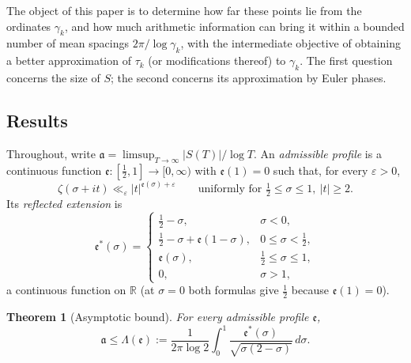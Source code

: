 \documentclass[11pt,a4paper]{article}
\numberwithin{equation}{section}
\newtheorem{theorem}{Theorem}[section]
\theoremstyle{definition}
\theoremstyle{remark}
\newcommand{\R}{\mathbb R}
\begin{document}
The object of this paper is to determine how far these points lie from the ordinates $\gamma_k$, and how much arithmetic information can bring it within a bounded number of mean spacings $2\pi/\log\gamma_k$, with the intermediate objective of obtaining a better approximation of $\tau_k$ (or modifications thereof) to $\gamma_k$. The first question concerns the size of $S$; the second concerns its approximation by Euler phases.

\subsection{Results}\label{subsec:results}
Throughout, write $\mathfrak a=\limsup_{T\to\infty}|S(T)|/\log T$. An \emph{admissible profile} is a continuous function $\mathfrak e:[\frac12,1]\to[0,\infty)$ with $\mathfrak e(1)=0$ such that, for every $\varepsilon>0$,
\begin{equation}
\zeta(\sigma+it)\ll_\varepsilon|t|^{\mathfrak e(\sigma)+\varepsilon}\qquad\text{uniformly for }\tfrac12\le\sigma\le1,\ |t|\ge2 .
\label{eq:admissible}
\end{equation}
Its \emph{reflected extension} is
\begin{equation}
\mathfrak e^*(\sigma)=\begin{cases}\frac12-\sigma,&\sigma<0,\\ \frac12-\sigma+\mathfrak e(1-\sigma),&0\le\sigma<\frac12,\\ \mathfrak e(\sigma),&\frac12\le\sigma\le1,\\ 0,&\sigma>1,\end{cases}
\label{eq:reflected}
\end{equation}
a continuous function on $\R$ (at $\sigma=0$ both formulas give $\frac12$ because $\mathfrak e(1)=0$).

\begin{theorem}[Asymptotic bound]\label{thm:asymptotic}
For every admissible profile $\mathfrak e$,
\begin{equation}
\mathfrak a\le\Lambda(\mathfrak e):=\frac1{2\pi\log2}\int_0^1\frac{\mathfrak e^*(\sigma)}{\sqrt{\sigma(2-\sigma)}}\,d\sigma .
\label{eq:asymptotic_formula}
\end{equation}
\end{theorem}
\end{document}
